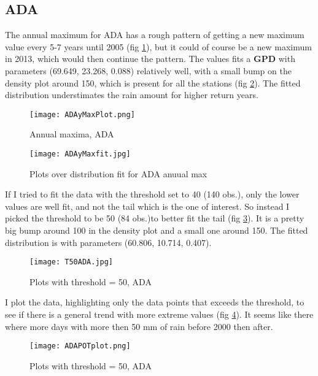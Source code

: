 \documentclass{article}
\begin{document}
 	\subsection{ADA}
 	The annual maximum for ADA has a rough pattern of getting a new maximum value every 5-7 years until 2005 (fig \ref{ADAyMax}), but it could of course be a new maximum in 2013, which would then continue the pattern. The values fits a \textbf{GPD} with parameters (69.649, 23.268, 0.088) relatively well, with a small bump on the density plot around 150, which is present for all the stations (fig \ref{ADAyMfit}). The fitted distribution understimates the rain amount for higher return years.
 	\begin{figure}[H]
 		\centering
 		\texttt{[image: ADAyMaxPlot.png]}
 		\caption{Annual maxima, ADA}
 		\label{ADAyMax}
 	\end{figure}
 	\begin{figure}[H]
 		\centering
 		\texttt{[image: ADAyMaxfit.jpg]}
 		\caption{Plots over distribution fit for ADA anuual max}
 		\label{ADAyMfit}
 	\end{figure}
 	If I tried to fit the data with the threshold set to 40 (140 obs.), only the lower values are well fit, and not the tail which is the one of interest. So instead I picked the threshold to be 50 (84 obs.)to better fit the tail (fig \ref{T50ADA}). It is a pretty big bump around 100 in the density plot and a small one around 150. The fitted distribution is with parameters (60.806, 10.714, 0.407). 
 		\begin{figure}[H]
 		\centering
 		\texttt{[image: T50ADA.jpg]}
 		\caption{Plots with threshold = 50, ADA}
 		\label{T50ADA}
 	\end{figure}
 	
 	I plot the data, highlighting only the data points that exceeds the threshold, to see if there is a general trend with more extreme values (fig \ref{ADAPOT}). It seems like there where more days with more then 50 mm of rain before 2000 then after.
 	\begin{figure}[H]
 		\centering
 		\texttt{[image: ADAPOTplot.png]}
 		\caption{Plots with threshold = 50, ADA}
 		\label{ADAPOT}
 	\end{figure}
\end{document}
